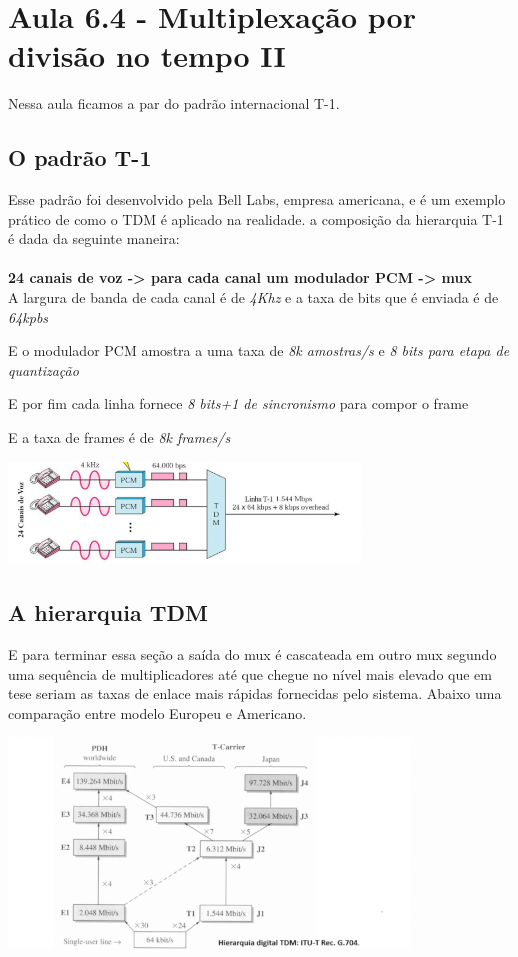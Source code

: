 \section{Aula 6.4 - Multiplexação por divisão no tempo II}

Nessa aula ficamos a par do padrão internacional T-1.

\subsection{O padrão T-1}

Esse padrão foi desenvolvido pela Bell Labs, empresa americana, e é um exemplo prático de como o TDM é aplicado na realidade.
a composição da hierarquia T-1 é dada da seguinte maneira:
\\\\
\textbf{24 canais de voz -> para cada canal um modulador PCM -> mux}
\\
A largura de banda de cada canal é de \textit{4Khz} e a taxa de bits que é enviada é de \textit{64kpbs}

E o modulador PCM amostra a uma taxa de \textit{8k amostras/s} e \textit{8 bits para etapa de quantização}

E por fim cada linha fornece \textit{8 bits+1 de sincronismo} para compor o frame

E a taxa de frames é de \textit{8k frames/s}

\includegraphics[width=0.7\textwidth]{../assets/tdm.png}

\subsection{A hierarquia TDM}

E para terminar essa seção a saída do mux é cascateada em outro mux segundo uma sequência de multiplicadores até que chegue no nível mais elevado que em tese
seriam as taxas de enlace mais rápidas fornecidas pelo sistema. Abaixo uma comparação entre modelo Europeu e Americano.

\includegraphics[width=0.8\textwidth]{../assets/hire.png}

